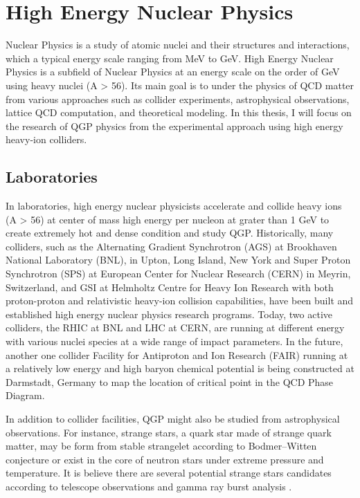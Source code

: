 \section{High Energy Nuclear Physics}

Nuclear Physics is a study of atomic nuclei and their structures and interactions, which a typical energy scale ranging from MeV to GeV. High Energy Nuclear Physics is a subfield of Nuclear Physics at an energy scale on the order of GeV using heavy nuclei (A > 56). Its main goal is to under the physics of QCD matter from various approaches such as collider experiments, astrophysical observations, lattice QCD computation, and theoretical modeling. In this thesis, I will focus on the research of QGP physics from the experimental approach using high energy heavy-ion colliders.

\subsection{Laboratories}

In laboratories, high energy nuclear physicists accelerate and collide heavy ions (A > 56) at center of mass high energy per nucleon at grater than 1 GeV to create extremely hot and dense condition and study QGP. Historically, many colliders, such as the Alternating Gradient Synchrotron (AGS) at Brookhaven National Laboratory (BNL), in Upton, Long Island, New York and Super Proton Synchrotron (SPS) at European Center for Nuclear Research (CERN) in Meyrin, Switzerland, and GSI at Helmholtz Centre for Heavy Ion Research with both proton-proton and relativistic heavy-ion collision capabilities, have been built and established high energy nuclear physics research programs. Today, two active colliders, the RHIC at BNL and LHC at CERN, are running at different energy with various nuclei species at a wide range of impact parameters. In the future, another one collider Facility for Antiproton and Ion Research (FAIR) running at a relatively low energy and high baryon chemical potential is being constructed at Darmstadt, Germany to map the location of critical point in the QCD Phase Diagram. 

In addition to collider facilities, QGP might also be studied from astrophysical observations. For instance, strange stars, a quark star made of strange quark matter, may be form from stable strangelet according to Bodmer--Witten conjecture \cite{SQMReview} or exist in the core of neutron stars under extreme pressure and temperature. It is believe there are several potential strange stars candidates according to telescope observations and gamma ray burst analysis \cite{SS1,SS2,SS3}.

